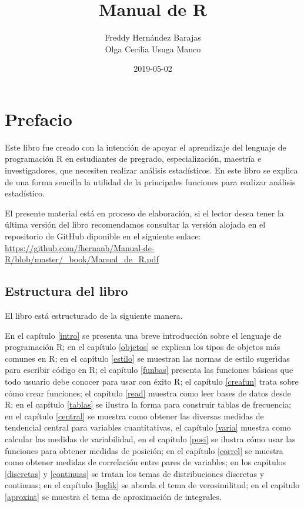 \documentclass[10pt,]{krantz}
\title{Manual de R}
\author{Freddy Hernández Barajas\\
Olga Cecilia Usuga Manco}
\date{2019-05-02}
\begin{document}
\maketitle

{
\hypersetup{linkcolor=black}
\setcounter{tocdepth}{2}
\tableofcontents
}
\listoftables
\listoffigures
\section*{Prefacio}\label{prefacio}

Este libro fue creado con la intención de apoyar el aprendizaje del
lenguaje de programación R en estudiantes de pregrado, especialización,
maestría e investigadores, que necesiten realizar análisis estadísticos.
En este libro se explica de una forma sencilla la utilidad de la
principales funciones para realizar análisis estadístico.

El presente material está en proceso de elaboración, si el lector desea
tener la última versión del libro recomendamos consultar la versión
alojada en el repositorio de GitHub diponible en el siguiente enlace:
\url{https://github.com/fhernanb/Manual-de-R/blob/master/_book/Manual_de_R.pdf}

\subsection*{Estructura del libro}\label{estructura-del-libro}

El libro está estructurado de la siguiente manera.

En el capítulo \ref{intro} se presenta una breve introducción sobre el
lenguaje de programación R; en el capítulo \ref{objetos} se explican los
tipos de objetos más comunes en R; en el capítulo \ref{estilo} se
muestran las normas de estilo sugeridas para escribir código en R; el
capítulo \ref{funbas} presenta las funciones básicas que todo usuario
debe conocer para usar con éxito R; el capítulo \ref{creafun} trata
sobre cómo crear funciones; el capítulo \ref{read} muestra como leer
bases de datos desde R; en el capítulo \ref{tablas} se ilustra la forma
para construir tablas de frecuencia; en el capítulo \ref{central} se
muestra como obtener las diversas medidas de tendencial central para
variables cuantitativas, el capítulo \ref{varia} muestra como calcular
las medidas de variabilidad, en el capítulo \ref{posi} se ilustra cómo
usar las funciones para obtener medidas de posición; en el capítulo
\ref{correl} se muestra como obtener medidas de correlación entre pares
de variables; en los capítulos \ref{discretas} y \ref{continuas} se
tratan los temas de distribuciones discretas y continuas; en el capítulo
\ref{loglik} se aborda el tema de verosimilitud; en el capítulo
\ref{aproxint} se muestra el tema de aproximación de integrales.
\end{document}
